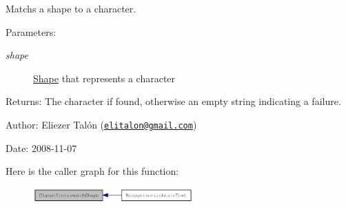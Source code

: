 Matchs a shape to a character. 

\begin{Desc}
\item[Parameters:]
\begin{description}
\item[{\em shape}]\hyperlink{class_shape}{Shape} that represents a character\end{description}
\end{Desc}
\begin{Desc}
\item[Returns:]The character if found, otherwise an empty string indicating a failure.\end{Desc}
\begin{Desc}
\item[Author:]Eliezer Talón (\href{mailto:elitalon@gmail.com}{\tt elitalon@gmail.com}) \end{Desc}
\begin{Desc}
\item[Date:]2008-11-07 \end{Desc}


Here is the caller graph for this function:\nopagebreak
\begin{figure}[H]
\begin{center}
\leavevmode
\includegraphics[width=174pt]{class_classifier_6fd6a8332d3188ac605ff452ab6dc9c2_icgraph}
\end{center}
\end{figure}
